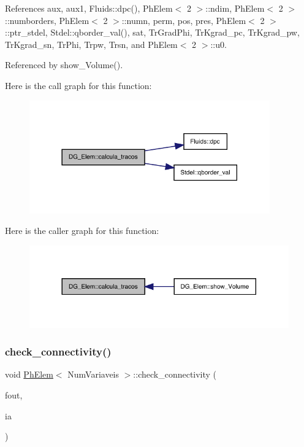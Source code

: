 References aux, aux1, Fluids\+::dpc(), Ph\+Elem$<$ 2 $>$\+::ndim, Ph\+Elem$<$ 2 $>$\+::numborders, Ph\+Elem$<$ 2 $>$\+::numn, perm, pos, pres, Ph\+Elem$<$ 2 $>$\+::ptr\+\_\+stdel, Stdel\+::qborder\+\_\+val(), sat, Tr\+Grad\+Phi, Tr\+Kgrad\+\_\+pc, Tr\+Kgrad\+\_\+pw, Tr\+Kgrad\+\_\+sn, Tr\+Phi, Trpw, Trsn, and Ph\+Elem$<$ 2 $>$\+::u0.



Referenced by show\+\_\+\+Volume().

Here is the call graph for this function\+:
\nopagebreak
\begin{figure}[H]
\begin{center}
\leavevmode
\includegraphics[width=294pt]{classDG__Elem_a64d352e6b9eeeeca73368a9ef92a94c2_cgraph}
\end{center}
\end{figure}
Here is the caller graph for this function\+:
\nopagebreak
\begin{figure}[H]
\begin{center}
\leavevmode
\includegraphics[width=317pt]{classDG__Elem_a64d352e6b9eeeeca73368a9ef92a94c2_icgraph}
\end{center}
\end{figure}
\mbox{\label{classPhElem_a76ba4a82c7f21f9a83808315903692fe}} 
\subsubsection{\texorpdfstring{check\+\_\+connectivity()}{check\_connectivity()}}
{\footnotesize\ttfamily void \hyperlink{classPhElem}{Ph\+Elem}$<$ Num\+Variaveis $>$\+::check\+\_\+connectivity (\begin{DoxyParamCaption}\item[{F\+I\+LE $\ast$}]{fout,  }\item[{const int \&}]{ia }\end{DoxyParamCaption})\hspace{0.3cm}{\ttfamily [inherited]}}



